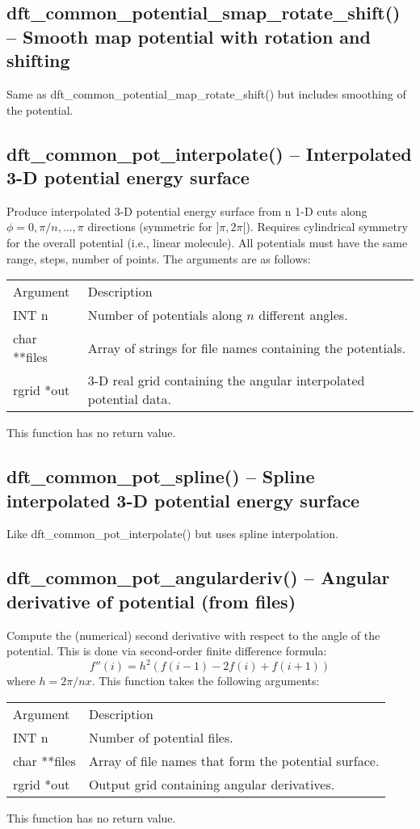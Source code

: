 \documentclass[12pt,letterpaper]{report}
\begin{document}
\subsection{dft\_common\_potential\_smap\_rotate\_shift() -- Smooth map potential with rotation and shifting}

Same as dft\_common\_potential\_map\_rotate\_shift() but includes smoothing of the potential.

\subsection{dft\_common\_pot\_interpolate() -- Interpolated 3-D potential energy surface}

Produce interpolated 3-D potential energy surface from n 1-D cuts along $\phi = 0, \pi/n, ..., \pi$ directions (symmetric for $]\pi,2\pi[$). Requires cylindrical symmetry for the overall potential (i.e., linear molecule). All potentials must have the same range, steps, number of points. The arguments are as follows:
\begin{longtable}{p{} p{}}
Argument & Description\\
\cline{1-2}
INT n & Number of potentials along $n$ different angles.\\
char **files & Array of strings for file names containing the potentials.\\
rgrid *out & 3-D real grid containing the angular interpolated potential data.\\
\end{longtable}
\noindent
This function has no return value.

\subsection{dft\_common\_pot\_spline() -- Spline interpolated 3-D potential energy surface}

Like dft\_common\_pot\_interpolate() but uses spline interpolation.

\subsection{dft\_common\_pot\_angularderiv() -- Angular derivative of potential (from files)}

Compute the (numerical) second derivative with respect to the angle of the potential.
This is done via second-order finite difference formula:
$$f''(i) = h^2 ( f(i-1) - 2f(i) + f(i+1) )$$
where $h = 2\pi / nx$. This function takes the following arguments:
\begin{longtable}{p{} p{}}
Argument & Description\\
\cline{1-2}
INT n & Number of potential files.\\
char **files & Array of file names that form the potential surface.\\
rgrid *out & Output grid containing angular derivatives.\\
\end{longtable}
\noindent
This function has no return value.
\end{document}
